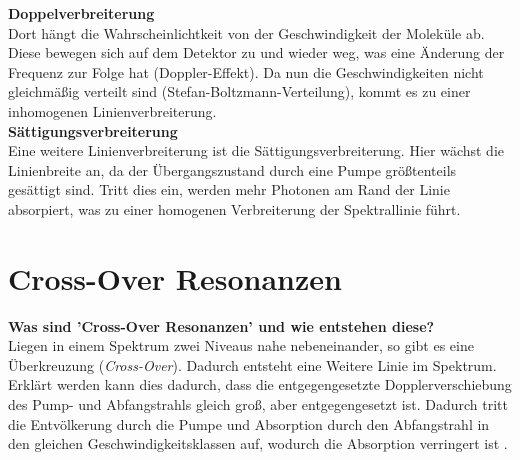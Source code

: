 \textbf{Doppelverbreiterung}\\
Dort hängt die Wahrscheinlichtkeit von der Geschwindigkeit der Moleküle ab.
Diese bewegen sich auf dem Detektor zu und wieder weg, was eine Änderung der Frequenz zur Folge hat (Doppler-Effekt).
Da nun die Geschwindigkeiten nicht gleichmäßig verteilt sind (Stefan-Boltzmann-Verteilung), kommt es zu einer inhomogenen Linienverbreiterung.\\

\textbf{Sättigungsverbreiterung}\\
Eine weitere Linienverbreiterung ist die Sättigungsverbreiterung.
Hier wächst die Linienbreite an, da der Übergangszustand durch eine Pumpe größtenteils gesättigt sind.
Tritt dies ein, werden mehr Photonen am Rand der Linie absorpiert, was zu einer homogenen Verbreiterung der Spektrallinie führt.
\section{Cross-Over Resonanzen}
\textbf{Was sind 'Cross-Over Resonanzen' und wie entstehen diese?}\\

Liegen in einem Spektrum zwei Niveaus nahe nebeneinander, so gibt es eine Überkreuzung (\textit{Cross-Over}).
Dadurch entsteht eine Weitere Linie im Spektrum.\\

Erklärt werden kann dies dadurch, dass die entgegengesetzte Dopplerverschiebung des Pump- und Abfangstrahls gleich groß, aber entgegengesetzt ist.
Dadurch tritt die Entvölkerung durch die Pumpe und Absorption durch den Abfangstrahl in den gleichen Geschwindigkeitsklassen auf, wodurch die Absorption verringert ist \citep[vgl.][]{Wiki-Dopp}.